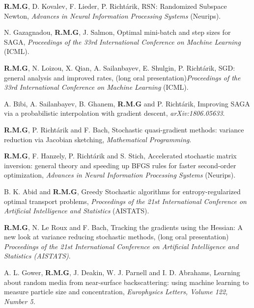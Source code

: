 \begin{bibsection}
\item { \bf R.M.G}, D. Kovalev, F. Lieder, P. Richt\'arik, RSN: Randomized Subspace Newton, \emph{ Advances in Neural Information Processing Systems} (Neurips).

\item N. Gazagnadou, { \bf R.M.G}, J. Salmon,
Optimal mini-batch and step sizes for SAGA,
\emph{Proceedings of the 33rd International Conference on Machine Learning} (ICML).


\item  { \bf R.M.G},  N. Loizou, X. Qian, A. Sailanbayev, E. Shulgin, P. Richt\'arik,
SGD: general analysis and improved rates,
 (long oral presentation)\emph{Proceedings of the 33rd International Conference on Machine Learning} (ICML).

\item[2018] A. Bibi, A. Sailanbayev, B. Ghanem, { \bf R.M.G} and P. Richt\'arik,
Improving SAGA via a probabilistic interpolation with gradient descent,  \emph{arXiv:1806.05633}.


\item { \bf R.M.G}, P. Richt\'arik and F. Bach,
Stochastic quasi-gradient methods: variance reduction via Jacobian sketching, \emph{Mathematical Programming}.

\item { \bf R.M.G}, F. Hanzely, P. Richt\'arik and S. Stich,
Accelerated stochastic matrix inversion: general theory and speeding up BFGS rules for faster second-order optimization, \emph{Advances in Neural Information Processing Systems} (Neurips).

\item B. K. Abid and { \bf R.M.G},
Greedy Stochastic algorithms for entropy-regularized optimal transport problems, \emph{Proceedings of the 21st International Conference on Artificial Intelligence and Statistics} (AISTATS). %

\item { \bf R.M.G}, N. Le Roux and F. Bach,
	Tracking the gradients using the Hessian: A new look at variance reducing stochastic methods,
(long oral presentation) \emph{Proceedings of the 21st International Conference on Artificial Intelligence and Statistics (AISTATS)}. %
	
\item   A. L. Gower, { \bf R.M.G}, J. Deakin, W. J. Parnell and I. D. Abrahams,
Learning about random media from near-surface backscattering: using machine learning to measure particle size and concentration,
\emph{Europhysics Letters, Volume 122, Number 5.}
	

\end{bibsection}

